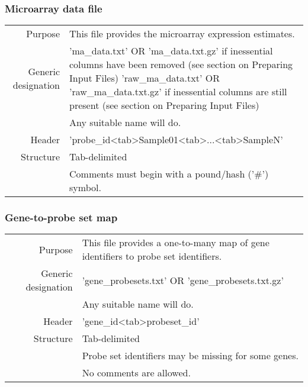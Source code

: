 \documentclass[a4paper,12pt]{article}
\begin{document}
\subsubsection{Microarray data file}

\begin{tabular}{rp{12cm}}
Purpose & This file provides the microarray expression estimates. \\
Generic designation & 'ma\_data.txt' OR 'ma\_data.txt.gz' if inessential columns have been removed (see section on Preparing Input Files)
'raw\_ma\_data.txt' OR 'raw\_ma\_data.txt.gz' if inessential columns are still present (see section on Preparing Input Files) \\
  & Any suitable name will do. \\
Header & 'probe\_id\textless tab\textgreater Sample01\textless tab\textgreater...\textless tab\textgreater SampleN' \\
Structure & Tab-delimited \\
  & Comments must begin with a pound/hash ('\#') symbol. \\
\end{tabular}

\subsubsection{Gene-to-probe set map}

\begin{tabular}{rp{12cm}}
Purpose & This file provides a one-to-many map of gene identifiers to probe set identifiers. \\
Generic designation & 'gene\_probesets.txt' OR 'gene\_probesets.txt.gz' \\
  & Any suitable name will do. \\
Header & 'gene\_id\textless tab\textgreater probeset\_id' \\
Structure & Tab-delimited \\
  & Probe set identifiers may be missing for some genes. \\
  & No comments are allowed. \\
\end{tabular}
\end{document}
